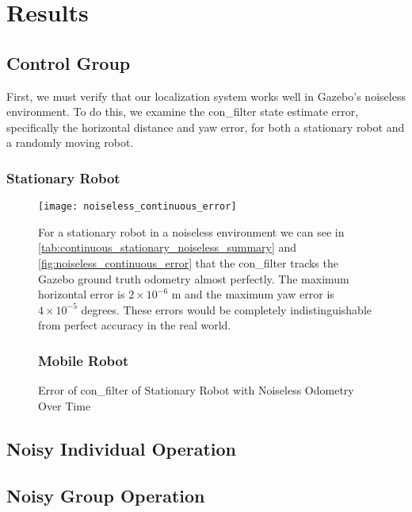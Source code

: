 \documentclass[thesis.tex]{subfile}
\begin{document}
\chapter{Results} \label{Results}
\section{Control Group}
First, we must verify that our localization system works well in Gazebo's noiseless environment. To do this, we examine the \gls{con_filter} state estimate error, specifically the horizontal distance and yaw error, for both a stationary robot and a randomly moving robot.

\subsection{Stationary Robot}


\begin{figure}
\centering
\texttt{[image: noiseless\_continuous\_error]}
\caption{Error of \gls{con_filter} of Stationary Robot with Noiseless Odometry Over Time}
\label{fig:noiseless_continuous_error}

For a stationary robot in a noiseless environment we can see in \autoref{tab:continuous_stationary_noiseless_summary} and \autoref{fig:noiseless_continuous_error} that the \gls{con_filter} tracks the Gazebo ground truth odometry almost perfectly. The maximum horizontal error is $2\times 10^{-6}$ m and the maximum yaw error is $4\times10^{-5}$ degrees. These errors would be completely indistinguishable from perfect accuracy in the real world.

\subsection{Mobile Robot}

\end{figure}
\section{Noisy Individual Operation}
\section{Noisy Group Operation}
\end{document}
